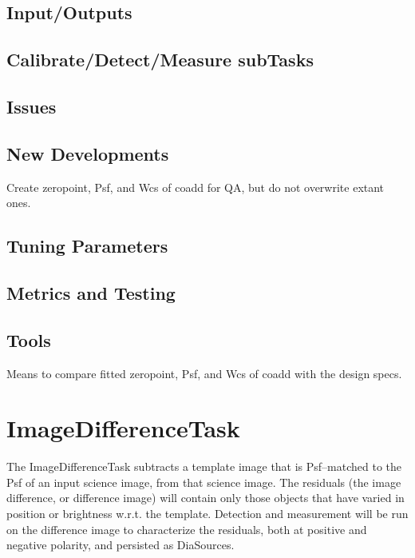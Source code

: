 \documentclass[12pt]{article}
\begin{document}
\subsection{Input/Outputs}

\subsection{Calibrate/Detect/Measure subTasks}

\subsection{Issues}

\subsection{New Developments}
Create zeropoint, Psf, and Wcs of coadd for QA, but do not overwrite
extant ones.

\subsection{Tuning Parameters}

\subsection{Metrics and Testing}

\subsection{Tools}
Means to compare fitted zeropoint, Psf, and Wcs of coadd with the
design specs.


\clearpage 
\section{ImageDifferenceTask \label{sec-imagedifftask}} 

The ImageDifferenceTask subtracts a template image that is
Psf--matched to the Psf of an input science image, from that science
image.  The residuals (the image difference, or difference image) will
contain only those objects that have varied in position or brightness
w.r.t. the template.  Detection and measurement will be run on the
difference image to characterize the residuals, both at positive and
negative polarity, and persisted as DiaSources.
\end{document}
